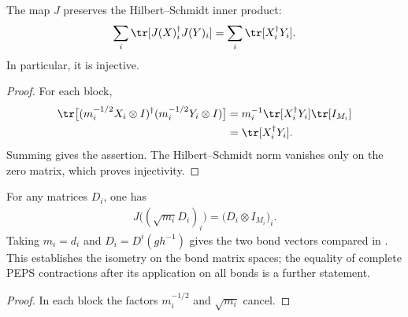 \begin{lemma}%
    \label{thm:peps_multiplicity_bond_isometry}
    \leanok
    The map $J$ preserves the Hilbert--Schmidt inner product:
    \begin{align}
        \sum_i\tr[J(X)_i^\dagger J(Y)_i]
        =\sum_i\tr[X_i^\dagger Y_i].
    \end{align}
    In particular, it is injective.
\end{lemma}

\begin{proof}\leanok
    For each block,
    \begin{align}
        \tr\bigl[(m_i^{-1/2}X_i\otimes I)^\dagger
            (m_i^{-1/2}Y_i\otimes I)\bigr]
         & =m_i^{-1}\tr[X_i^\dagger Y_i]\tr[I_{M_i}] \\
         & =\tr[X_i^\dagger Y_i].
    \end{align}
    Summing gives the assertion. The Hilbert--Schmidt norm vanishes
    only on the zero matrix, which proves injectivity.
\end{proof}

\begin{lemma}%
    \label{thm:peps_multiplicity_bond_weight}
    \leanok
    For any matrices $D_i$, one has
    \begin{align}
        J\bigl((\sqrt{m_i}D_i)_i\bigr)
        =\bigl(D_i\otimes I_{M_i}\bigr)_i.
    \end{align}
    Taking $m_i=d_i$ and $D_i=D^i(gh^{-1})$ gives the two bond vectors
    compared in \cite[Section~7]{Schuch2010PEPS}. This establishes the
    isometry on the bond matrix spaces; the equality of complete PEPS
    contractions after its application on all bonds is a further statement.
\end{lemma}

\begin{proof}\leanok
    In each block the factors $m_i^{-1/2}$ and $\sqrt{m_i}$ cancel.
\end{proof}

